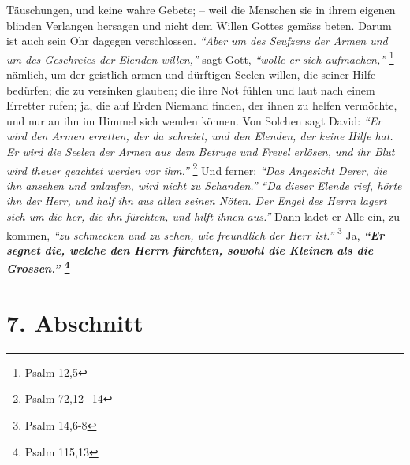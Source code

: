Täuschungen, und keine wahre Gebete; -- weil die Menschen sie in ihrem eigenen
blinden Verlangen hersagen und nicht dem Willen Gottes 
gemäss beten. Darum ist
auch sein Ohr dagegen verschlossen.
\textit{"`Aber um des Seufzens der Armen und um des Geschreies der Elenden
willen,"'}
sagt Gott,
\textit{"`wolle er sich aufmachen,"'}
\footnote{Psalm 12,5}
nämlich, um der geistlich armen und dürftigen
Seelen willen, die seiner Hilfe bedürfen; die zu versinken glauben; die ihre
Not fühlen und laut nach einem Erretter rufen; ja, die auf Erden Niemand
finden, der ihnen zu helfen vermöchte, und nur an ihn im Himmel sich wenden
können. Von Solchen sagt David:
\textit{"`Er wird den Armen erretten, der da schreiet,
und den Elenden, der keine Hilfe hat. Er wird die Seelen der Armen aus dem
Betruge und Frevel erlösen, und ihr Blut wird theuer geachtet werden vor
ihm."'}
\footnote{Psalm 72,12+14}
Und ferner:
\textit{"`Das Angesicht Derer, die ihn ansehen und anlaufen, wird nicht zu
Schanden."'}
\textit{"`Da dieser Elende rief, hörte ihn der Herr, und half ihn aus allen
seinen Nöten. Der Engel des Herrn lagert sich um die her, die ihn fürchten, und
hilft ihnen aus."'}
Dann ladet er Alle ein, zu kommen,
\textit{"`zu schmecken und zu sehen, wie freundlich der Herr ist."'}
\footnote{Psalm 14,6-8}
Ja, \textbf{\textit{"`Er segnet die, welche den Herrn fürchten,
sowohl die Kleinen als
die Grossen."'}
\footnote{Psalm 115,13}}

\section{7. Abschnitt} \label{kap6_ab7}


